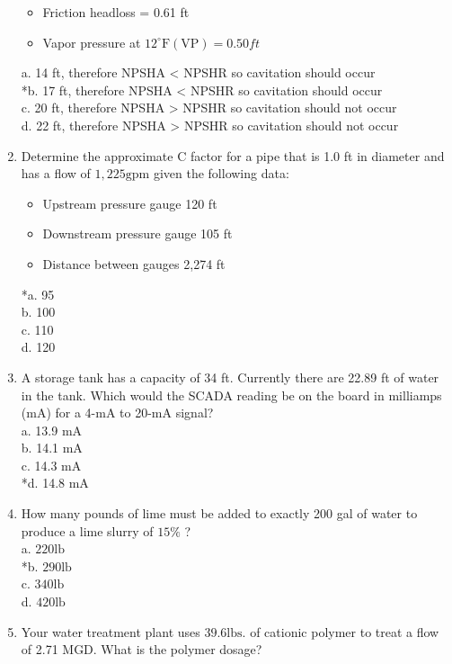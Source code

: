 \begin{enumerate}
\begin{itemize}
\item Friction headloss = 0.61 ft\\
\item Vapor pressure at $12^{\circ} \mathrm{F}(\mathrm{VP})=0.50 ft$\\
\end{itemize}
a. 14 ft, therefore NPSHA < NPSHR so cavitation should occur\\
*b. 17 ft, therefore NPSHA < NPSHR so cavitation should occur\\
c. 20 ft, therefore NPSHA > NPSHR so cavitation should not occur\\
d. 22 ft, therefore NPSHA > NPSHR so cavitation should not occur\\
\item Determine the approximate $\mathrm{C}$ factor for a pipe that is 1.0 ft in diameter and has a flow of $1,225 \mathrm{gpm}$ given the following data:\\
\begin{itemize}
\item Upstream pressure gauge 120 ft\\
\item Downstream pressure gauge 105 ft\\
\item Distance between gauges 2,274 ft\\
  \end{itemize}
*a. 95\\
b. 100\\
c. 110\\
d. 120\\
\item A storage tank has a capacity of 34 ft. Currently there are 22.89 ft of water in the tank. Which would the SCADA reading be on the board in milliamps (mA) for a 4-mA to 20-mA signal?\\
a. 13.9 mA\\
b. 14.1 mA\\
c. 14.3 mA\\
*d. 14.8 mA\\
\item How many pounds of lime must be added to exactly 200 gal of water to produce a lime slurry of $15 \%$ ?\\
a. $220 \mathrm{lb}$\\
*b. $290 \mathrm{lb}$\\
c. $340 \mathrm{lb}$\\
d. $420 \mathrm{lb}$ \\
\item Your water treatment plant uses $39.6 \mathrm{lbs}$. of cationic polymer to treat a flow of 2.71 MGD. What is the polymer dosage?\\

\end{enumerate}
